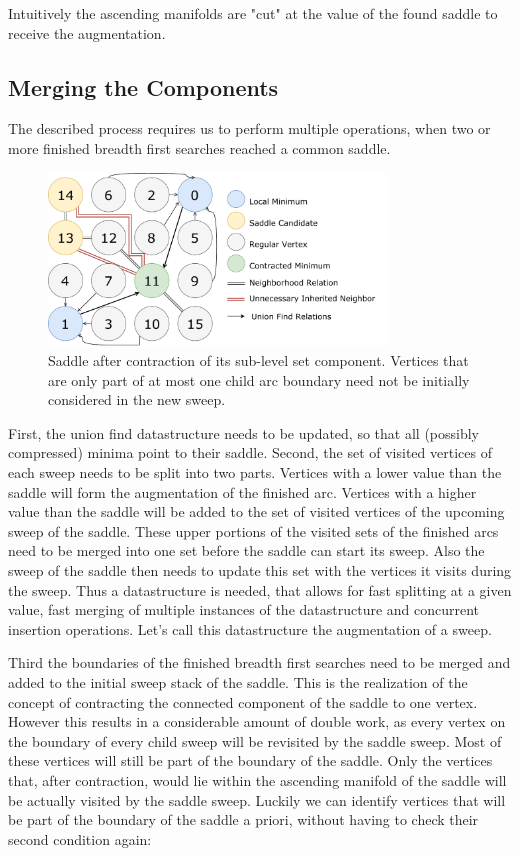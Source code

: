 \documentclass{scrartcl}
\begin{document}
Intuitively the ascending manifolds are "cut" at the value of the found saddle to receive the augmentation.

\subsection{Merging the Components}
The described process requires us to perform multiple operations, when two or more finished breadth first searches reached a common saddle. 

\begin{figure}[h!]
\centering
\includegraphics[width=0.8\textwidth]{figures/Unnes.pdf}
\caption{Saddle after contraction of its sub-level set component. Vertices that are only part of at most one child arc boundary need not be initially considered in the new sweep.}
\label{fig:un}
\end{figure}

First, the union find datastructure needs to be updated, so that all (possibly compressed) minima point to their saddle. Second, the set of visited vertices of each sweep needs to be split into two parts. Vertices with a lower value than the saddle will form the augmentation of the finished arc. Vertices with a higher value than the saddle will be added to the set of visited vertices of the upcoming sweep of the saddle. These upper portions of the visited sets of the finished arcs need to be merged into one set before the saddle can start its sweep. Also the sweep of the saddle then needs to update this set with the vertices it visits during the sweep. Thus a datastructure is needed, that allows for fast splitting at a given value, fast merging of multiple instances of the datastructure and concurrent insertion operations. Let's call this datastructure the augmentation of a sweep.

Third the boundaries of the finished breadth first searches need to be merged and added to the initial sweep stack of the saddle. This is the realization of the concept of contracting the connected component of the saddle to one vertex. However this results in a considerable amount of double work, as every vertex on the boundary of every child sweep will be revisited by the saddle sweep. Most of these vertices will still be part of the boundary of the saddle. Only the vertices that, after contraction, would lie within the ascending manifold of the saddle will be actually visited by the saddle sweep. Luckily we can identify vertices that will be part of the boundary of the saddle a priori, without having to check their second condition again:
\end{document}
